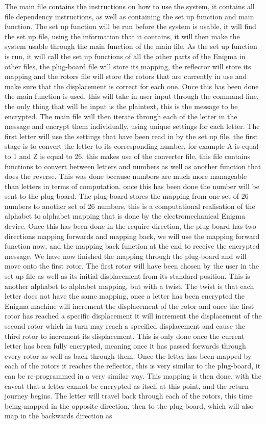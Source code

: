 \documentclass[12pt,a4paper]{article}
\begin{document}
The main file contains the instructions on how to use the system, it contains all file dependency instructions, as well as containing the set up function and main function. The set up function will be run before the system is usable, it will find the set up file, using the information that it contains, it will then make the system usable through the main function of the main file. As the set up function is run, it will call the set up functions of all the other parts of the Enigma in other files, the plug-board file will store its mapping, the reflector will store its mapping and the rotors file will store the rotors that are currently in use and make sure that the displacement is correct for each one. Once this has been done the main function is used, this will take in user input through the command line, the only thing that will be input is the plaintext, this is the message to be encrypted. The main file will then iterate through each of the letter in the message and encrypt them individually, using unique settings for each letter. The first letter will use the settings that have been read in by the set up file. the first stage is to convert the letter to its corresponding number, for example A is equal to 1 and Z is equal to 26, this makes use of the converter file, this file contains functions to convert between letters and numbers as well as another function that does the reverse. This was done because numbers are much more manageable than letters in terms of computation. once this has been done the number will be sent to the plug-board. The plug-board stores the mapping from one set of 26 numbers to another set of 26 numbers, this is a computational realisation of the alphabet to alphabet mapping that is done by the electromechanical Enigma device. Once this has been done in the require direction, the plug-board has two directions mapping forwards and mapping back, we will use the mapping forward function now, and the mapping back function at the end to receive the encrypted message. We have now finished the mapping through the plug-board and will move onto the first rotor. The first rotor will have been chosen by the user in the set up file as well as its initial displacement from its standard position. This is another alphabet to alphabet mapping, but with a twist. The twist is that each letter does not have the same mapping, once a letter has been encrypted the Enigma machine will increment the displacement of the rotor and once the first rotor has reached a specific displacement it will increment the displacement of the second rotor which in turn may reach a specified displacement and cause the third rotor to increment its displacement. This is only done once the current letter has been fully encrypted, meaning once it has passed forwards through every rotor as well as back through them. Once the letter has been mapped by each of the rotors it reaches the reflector, this is very similar to the plug-board, it can be re-programmed in a very similar way. This mapping is then done, with the caveat that a letter cannot be encrypted as itself at this point, and the return journey begins. The letter will travel back through each of the rotors, this time being mapped in the opposite direction, then to the plug-board, which will also map in the backwards direction as 
\end{document}
